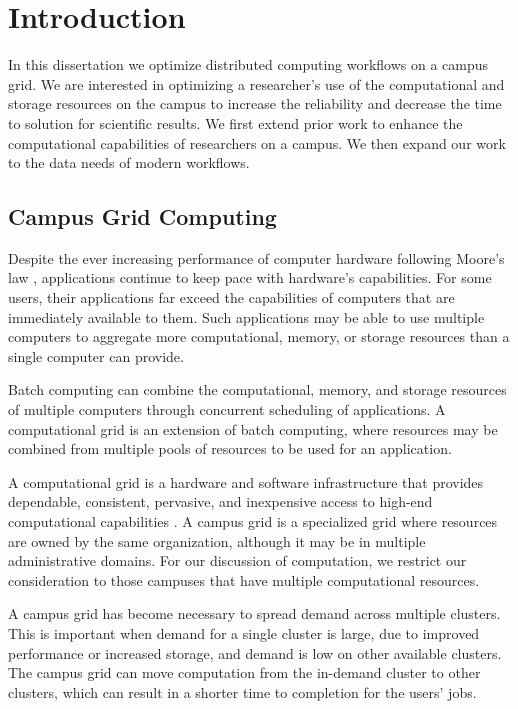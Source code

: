 \chapter{Introduction}

In this dissertation we optimize distributed computing workflows on a campus grid.  We are interested in optimizing a researcher's use of the computational and storage resources on the campus to increase the reliability and decrease the time to solution for scientific results.  We first extend prior work to enhance the computational capabilities of researchers on a campus.  We then expand our work to the data needs of modern workflows.

\section{Campus Grid Computing}

Despite the ever increasing performance of computer hardware following Moore's law \cite{schaller1997moore}, applications continue to keep pace with hardware's capabilities.  For some users, their applications far exceed the capabilities of computers that are immediately available to them.  Such applications may be able to use multiple computers to aggregate  more computational, memory, or storage resources than a single computer can \mbox{provide}.

Batch computing can combine the computational, memory, and storage resources of multiple computers through concurrent scheduling of applications.  A computational grid is an extension of batch computing, where resources may be combined from multiple pools of resources to be used for an application.

A computational grid is a hardware and software infrastructure that provides dependable, consistent, pervasive, and inexpensive access to high-end computational capabilities \cite{foster2004grid}.  A campus grid is a specialized grid where resources are owned by the same organization, although it may be in multiple administrative domains.  For our discussion of computation, we restrict our consideration to those campuses that have multiple computational resources.

A campus grid has become necessary to spread demand across multiple clusters.  This is important when demand for a single cluster is large, due to improved performance or increased storage, and demand is low on other available clusters.  The campus grid can move computation from the in-demand cluster to other clusters, which can result in a shorter time to completion for the users' jobs.

